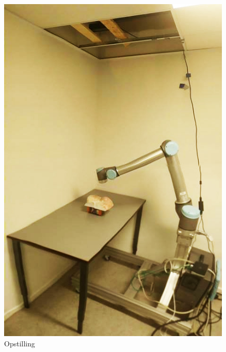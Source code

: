 \begin{figure}[H]
  \centering
  \begin{minipage}{0.4\textwidth}
    \includegraphics[width=\textwidth]{figurer/setup}
    \caption{Opstilling}
    \label{setup}
  \end{minipage}
  \hfill
  \begin{minipage}{0.4\textwidth}

\end{minipage}
\end{figure}
